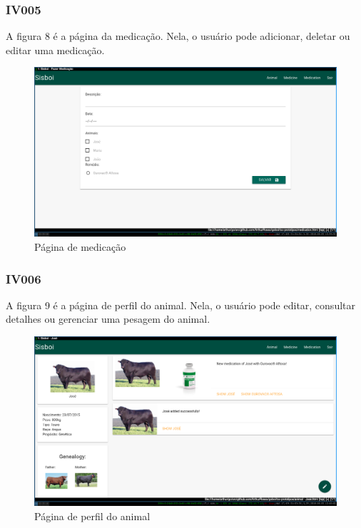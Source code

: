 \documentclass[12pt]{article}
\begin{document}
\newpage
\subsubsection{IV005}

A figura 8 é a página da medicação. Nela, o usuário pode adicionar, deletar ou editar uma medicação.
\begin{figure}[!h]
	\begin{center}
		\caption{Página de medicação}
		\includegraphics[width=13cm]{img/prototipos/medicacao.png}


	\end{center}
\end{figure}

\subsubsection{IV006}

A figura 9 é a página de perfil do animal. Nela, o usuário pode editar, consultar detalhes ou gerenciar uma pesagem do animal.
\begin{figure}[!h]
	\begin{center}
		\caption{Página de perfil do animal}
		\includegraphics[width=13cm]{img/prototipos/perfil.png}


	\end{center}
\end{figure}
\end{document}
